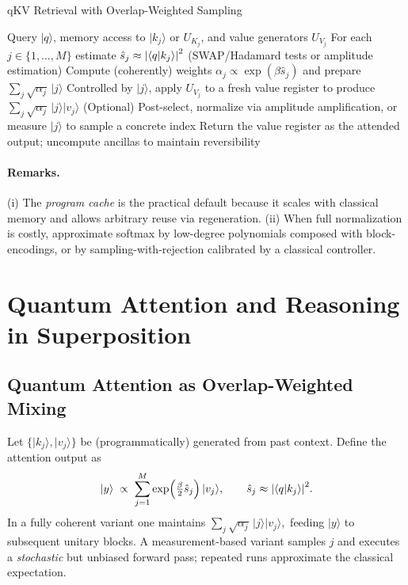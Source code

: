 \documentclass[11pt]{article}
\newcommand{\qket}[1]{\lvert #1 \rangle}
\newcommand{\qip}[2]{\langle #1 \vert #2 \rangle}
\begin{document}
\begin{algorithm}[t]
\caption{qKV Retrieval with Overlap-Weighted Sampling}
\label{alg:qkv}
\begin{algorithmic}[1]
\Require Query $\qket{q}$, memory access to $\qket{k_j}$ or $U_{K_j}$, and value generators $U_{V_j}$
\State For each $j\in\{1,\dots,M\}$ estimate $\hat{s}_j \approx \abs{\qip{q}{k_j}}^2$ (SWAP/Hadamard tests or amplitude estimation)
\State Compute (coherently) weights $\alpha_j \propto \exp(\beta \hat{s}_j)$ and prepare $\sum_j \sqrt{\alpha_j}\,\qket{j}$
\State Controlled by $\qket{j}$, apply $U_{V_j}$ to a fresh value register to produce $\sum_j \sqrt{\alpha_j}\,\qket{j}\qket{v_j}$
\State (Optional) Post-select, normalize via amplitude amplification, or measure $\qket{j}$ to sample a concrete index
\State Return the value register as the attended output; uncompute ancillas to maintain reversibility
\end{algorithmic}
\end{algorithm}

\paragraph{Remarks.}
(i) The \emph{program cache} is the practical default because it scales with classical memory and allows arbitrary reuse via regeneration.
(ii) When full normalization is costly, approximate softmax by low-degree polynomials composed with block-encodings, or by sampling-with-rejection calibrated by a classical controller.

\section{Quantum Attention and Reasoning in Superposition}

\subsection{Quantum Attention as Overlap-Weighted Mixing}
Let $\{\qket{k_j}, \qket{v_j}\}$ be (programmatically) generated from past context.
Define the attention output as
\begin{equation}
    \qket{y} \;\propto\; \sum_{j=1}^{M} \exp\!\Big(\tfrac{\beta}{2}\hat{s}_j\Big)\,\qket{v_j},
    \qquad \hat{s}_j \approx \abs{\qip{q}{k_j}}^2.
\end{equation}
In a fully coherent variant one maintains
\(
\sum_j \sqrt{\alpha_j}\,\qket{j}\qket{v_j},
\)
feeding $\qket{y}$ to subsequent unitary blocks.
A measurement-based variant samples $j$ and executes a \emph{stochastic} but unbiased forward pass; repeated runs approximate the classical expectation.
\end{document}
